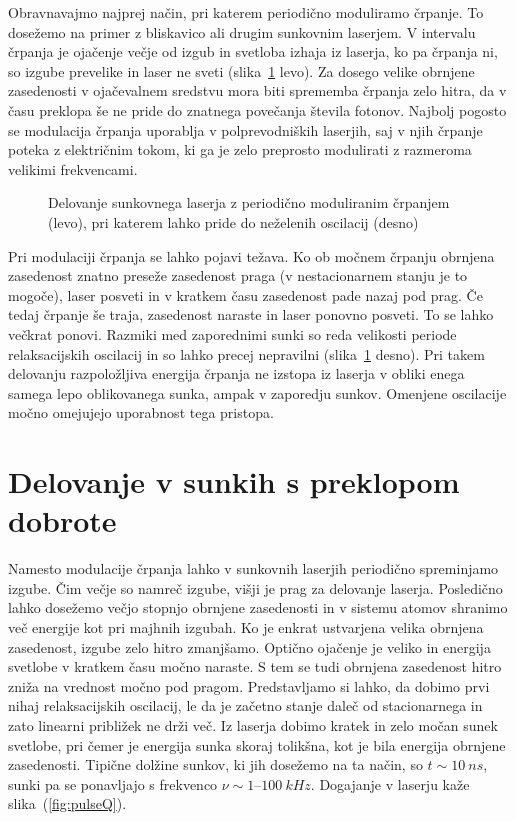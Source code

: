 Obravnavajmo najprej način, pri katerem periodično moduliramo črpanje.
To dosežemo na primer z bliskavico ali drugim sunkovnim laserjem. V 
intervalu 
črpanja je ojačenje večje od izgub in svetloba izhaja iz laserja, ko pa črpanja 
ni, so izgube prevelike in laser ne sveti (slika~\ref{fig:Gswitch} levo). Za dosego velike
obrnjene zasedenosti v ojačevalnem sredstvu mora biti sprememba črpanja zelo hitra, 
da v času preklopa še ne pride do znatnega povečanja števila fotonov. 
Najbolj pogosto se modulacija črpanja uporablja
v polprevodniških laserjih, saj v njih črpanje poteka z električnim tokom, ki 
ga je zelo preprosto modulirati z razmeroma velikimi frekvencami. 
\begin{figure}[h]
\centering
\def\svgwidth{140truemm} 

\caption{Delovanje sunkovnega laserja z periodično moduliranim črpanjem (levo), 
pri katerem lahko pride do neželenih oscilacij (desno)}
\label{fig:Gswitch}
\end{figure}

Pri modulaciji črpanja se lahko pojavi težava. Ko ob močnem črpanju 
obrnjena zasedenost znatno preseže zasedenost praga (v nestacionarnem stanju 
je to mogoče), laser posveti in v kratkem času zasedenost pade nazaj pod prag. 
Če tedaj črpanje še traja, zasedenost naraste in laser ponovno posveti. 
To se lahko večkrat ponovi. Razmiki med zaporednimi sunki
so reda velikosti periode relaksacijskih oscilacij in so lahko precej
nepravilni  (slika~\ref{fig:Gswitch} desno). Pri takem delovanju
razpoložljiva energija črpanja ne izstopa iz laserja v obliki enega samega lepo oblikovanega sunka, 
ampak v zaporedju sunkov. Omenjene oscilacije močno omejujejo uporabnost tega pristopa.

\section{Delovanje v sunkih s preklopom dobrote}
\label{qswitch}
Namesto modulacije črpanja lahko v sunkovnih laserjih periodično spreminjamo 
izgube. Čim večje so namreč izgube, višji 
je prag za delovanje laserja. 
Posledično lahko dosežemo večjo stopnjo obrnjene zasedenosti in v sistemu atomov shranimo več 
energije kot pri majhnih izgubah.
Ko je enkrat ustvarjena velika obrnjena zasedenost, izgube zelo hitro zmanjšamo. 
Optično ojačenje je veliko in energija svetlobe v kratkem času močno naraste. 
S tem se tudi obrnjena zasedenost hitro zniža na vrednost močno pod pragom.
Predstavljamo si lahko, da dobimo prvi nihaj relaksacijskih oscilacij, le da
je začetno stanje daleč od stacionarnega in zato linearni približek ne drži več.
Iz laserja dobimo kratek in zelo močan sunek svetlobe, pri čemer je energija
sunka skoraj tolikšna, kot je bila energija obrnjene zasedenosti. Tipične
dolžine sunkov, ki jih dosežemo na ta način, so $t \sim 10~\si{ns}$, sunki
pa se ponavljajo s frekvenco $\nu \sim 1$--$100~\si{kHz}$.
Dogajanje v laserju kaže slika~(\ref{fig:pulseQ}).

